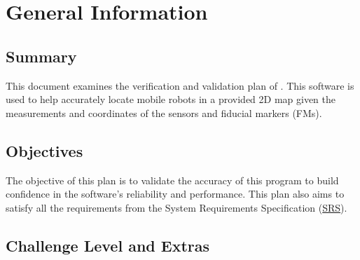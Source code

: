 \documentclass[12pt, titlepage]{article}
\begin{document}
\section{General Information}\label{sec_general}

\subsection{Summary}

This document examines the verification and validation plan of \progname. This software is used to help accurately locate mobile robots in a provided 2D map given the measurements and coordinates of the sensors and fiducial markers (FMs).

\subsection{Objectives}

The objective of this plan is to validate the accuracy of this program to build confidence in the software's reliability and performance. This plan also aims to satisfy all the requirements from the System Requirements Specification (\href{https://github.com/AliyahJimoh/2D-Localizer/blob/main/docs/SRS/SRS.pdf}{SRS}).  




\subsection{Challenge Level and Extras}
\end{document}
